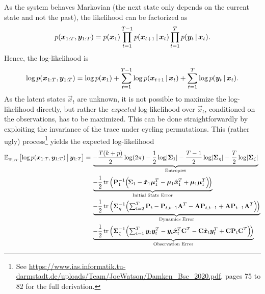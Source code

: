 			As the system behaves Markovian (the next state only depends on the current state and not the past), the likelihood can be factorized as
			\begin{equation*}
				p(\bm{x}_{1:T}, \bm{y}_{1:T}) = p(\bm{x}_1) \prod_{t = 1}^{T - 1} p(\bm{x}_{t + 1} \,\vert\, \bm{x}_t) \prod_{t = 1}^{T} p(\bm{y}_t \,\vert\, \bm{x}_t).
			\end{equation*}
			Hence, the log-likelihood is
			\begin{equation*}
				\log p(\bm{x}_{1:T}, \bm{y}_{1:T}) = \log p(\bm{x}_1) + \sum_{t = 1}^{T - 1} \log p(\bm{x}_{t + 1} \,\vert\, \bm{x}_t) + \sum_{t = 1}^{T} \log p(\bm{y}_t \,\vert\, \bm{x}_t).
			\end{equation*}
			As the latent states \(\vec{x}_t\) are unknown, it is not possible to maximize the log-likelihood directly, but rather the \emph{expected} log-likelihood over \(\vec{x}_t\), conditioned on the observations, has to be maximized. This can be done straightforwardly by exploiting the invariance of the trace under cycling permutations. This (rather ugly) process\footnote{See \url{https://www.ias.informatik.tu-darmstadt.de/uploads/Team/JoeWatson/Damken_Bsc_2020.pdf}, pages 75 to 82 for the full derivation.} yields the expected log-likelihood
			\begin{align*}
				\mathbb{E}_{\bm{x}_{1:T}}\big[\! \log p(\bm{x}_{1:T}, \bm{y}_{1:T}) \,\big\vert\, \bm{y}_{1:T} \big] =\,
					& \underbrace{-\frac{T (k + p)}{2} \log(2\pi) - \frac{1}{2} \log \lvert \bm{\mathrm{\Sigma}}_1 \rvert - \frac{T - 1}{2} \log \lvert \bm{\mathrm{\Sigma}}_\eta \rvert - \frac{T}{2} \log \lvert \bm{\mathrm{\Sigma}}_\zeta \rvert}_\text{Entropies} \\
					& \underbrace{-\frac{1}{2} \tr\Big( \bm{\mathrm{P}}_1^{-1} \Big(\! \bm{\mathrm{\Sigma}}_1 - \hat{\bm{x}}_1 \bm{\mu}_1^T - \bm{\mu}_1 \hat{\bm{x}}_1^T + \bm{\mu}_1 \bm{\mu}_1^T \Big) \!\Big)}_\text{Initial State Error} \\
					& \underbrace{-\frac{1}{2} \tr\Big( \bm{\mathrm{\Sigma}}_\eta^{-1} \Big(\! \textstyle\sum_{t = 2}^{T}\displaystyle \bm{\mathrm{P}}_t - \bm{\mathrm{P}}_{t, t - 1} \bm{\mathrm{A}}^T - \bm{\mathrm{A}} \bm{\mathrm{P}}_{t, t - 1} + \bm{\mathrm{A}} \bm{\mathrm{P}}_{t - 1} \bm{\mathrm{A}}^T \Big) \!\Big)}_\text{Dynamics Error} \\
					& \underbrace{-\frac{1}{2} \tr\Big( \bm{\mathrm{\Sigma}}_\zeta^{-1} \Big(\! \textstyle\sum_{t = 1}^{T}\displaystyle \bm{y}_t \bm{y}_t^T - \bm{y}_t \hat{\bm{x}}_t^T \bm{\mathrm{C}}^T - \bm{\mathrm{C}} \hat{\bm{x}}_t \bm{y}_t^T + \bm{\mathrm{C}} \bm{\mathrm{P}}_t \bm{\mathrm{C}}^T \Big) \!\Big)}_\text{Observation Error}
			\end{align*}
